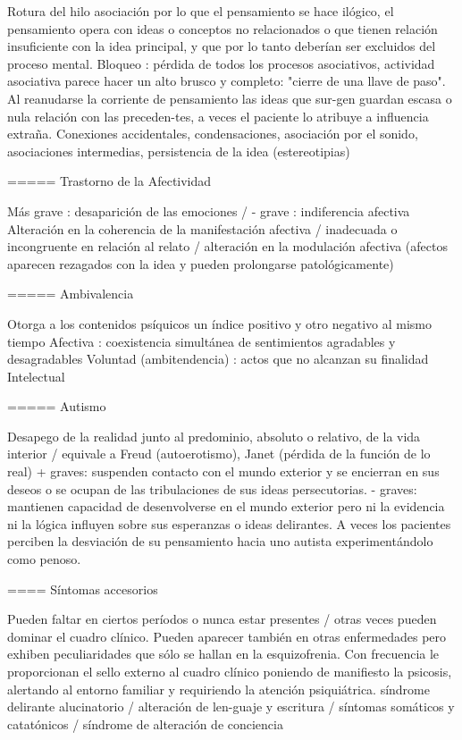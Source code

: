 Rotura del hilo asociación por lo que el pensamiento se hace ilógico, el pensamiento opera con ideas o conceptos no relacionados o que tienen relación insuficiente con la idea principal, y que por lo tanto deberían ser excluidos del proceso mental. Bloqueo : pérdida de todos los procesos asociativos, actividad asociativa parece hacer un alto brusco y completo: "cierre de una llave de paso". Al reanudarse la corriente de pensamiento las ideas que sur-gen guardan escasa o nula relación con las preceden-tes, a veces el paciente lo atribuye a influencia extraña. Conexiones accidentales, condensaciones, asociación por el sonido, asociaciones intermedias, persistencia de la idea (estereotipias)

===== Trastorno de la Afectividad

Más grave : desaparición de las emociones / - grave : indiferencia afectiva Alteración en la coherencia de la manifestación afectiva / inadecuada o incongruente en relación al relato / alteración en la modulación afectiva (afectos aparecen rezagados con la idea y pueden prolongarse patológicamente)

===== Ambivalencia

Otorga a los contenidos psíquicos un índice positivo y otro negativo al mismo tiempo Afectiva : coexistencia simultánea de sentimientos agradables y desagradables Voluntad (ambitendencia) : actos que no alcanzan su finalidad Intelectual

===== Autismo

Desapego de la realidad junto al predominio, absoluto o relativo, de la vida interior / equivale a Freud (autoerotismo), Janet (pérdida de la función de lo real) + graves: suspenden contacto con el mundo exterior y se encierran en sus deseos o se ocupan de las tribulaciones de sus ideas persecutorias. - graves: mantienen capacidad de desenvolverse en el mundo exterior pero ni la evidencia ni la lógica influyen sobre sus esperanzas o ideas delirantes. A veces los pacientes perciben la desviación de su pensamiento hacia uno autista experimentándolo como penoso.

==== Síntomas accesorios

Pueden faltar en ciertos períodos o nunca estar presentes / otras veces pueden dominar el cuadro clínico. Pueden aparecer también en otras enfermedades pero exhiben peculiaridades que sólo se hallan en la esquizofrenia. Con frecuencia le proporcionan el sello externo al cuadro clínico poniendo de manifiesto la psicosis, alertando al entorno familiar y requiriendo la atención psiquiátrica. síndrome delirante alucinatorio / alteración de len-guaje y escritura / síntomas somáticos y catatónicos / síndrome de alteración de conciencia

